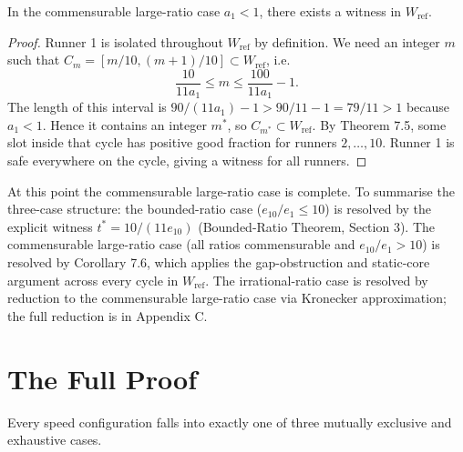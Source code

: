 \documentclass[12pt]{article}
\begin{document}
\begin{corollary}\label{c:74}
In the commensurable large-ratio case
$a_1<1$, there exists a witness in $W_{\mathrm{ref}}$.

\end{corollary}
\begin{proof}
Runner 1 is isolated throughout $W_{\mathrm{ref}}$ by definition. We need an integer $m$
such that $C_m=[m/10,(m+1)/10]\subset W_{\mathrm{ref}}$, i.e.
\[
\frac{10}{11a_1} \le m \le \frac{100}{11a_1}-1.
\]
The length of this interval is $90/(11a_1)-1>90/11-1=79/11>1$ because $a_1<1$. Hence it
contains an integer $m^*$, so $C_{m^*}\subset W_{\mathrm{ref}}$. By Theorem 7.5,
some slot inside that cycle has positive good fraction for runners $2,\ldots,10$. Runner 1
is safe everywhere on the cycle, giving a witness for all runners.
\end{proof}

At this point the commensurable large-ratio case is complete. To summarise the three-case
structure: the bounded-ratio case ($e_{10}/e_1\le 10$) is resolved by the explicit witness
$t^*=10/(11e_{10})$ (Bounded-Ratio Theorem, Section 3). The commensurable large-ratio case
(all ratios commensurable and $e_{10}/e_1>10$) is resolved by Corollary 7.6, which applies
the gap-obstruction and static-core argument across every cycle in $W_{\mathrm{ref}}$. The
irrational-ratio case is resolved by reduction to the commensurable large-ratio case via
Kronecker approximation; the full reduction is in Appendix C.



\section{The Full Proof}

Every speed configuration falls into exactly one of three mutually exclusive and
exhaustive cases.
\end{document}

